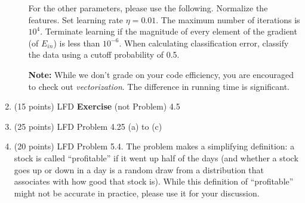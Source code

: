 \documentclass[11pt]{article}
\begin{document}
\begin{enumerate}
\begin{itemize}
    \vspace{5pt}
    For the other parameters, please use the following. 
    Normalize the features. 
    Set learning rate $\eta=0.01$. 
    The maximum number of iterations is $10^4$. 
    Terminate learning if the magnitude of every element of the gradient (of $E_{in}$) is less than $10^{-6}$.
    When calculating classification error, classify the data using a cutoff probability of 0.5.

    \vspace{5pt}
    \textbf{Note:} While we don't grade on your code efficiency, you are encouraged to check out \emph{vectorization}. The difference in running time is significant.

\end{itemize}
\item (15 points) LFD \textbf{Exercise} (not Problem) 4.5

\item (25 points) LFD Problem 4.25 (a) to (c) 

\item (20 points) LFD Problem 5.4. 
The problem makes a simplifying definition: a stock is called ``profitable'' if it went up half of the days (and whether a stock goes up or down in a day is a random draw from a distribution that associates with how good that stock is).
While this definition of ``profitable'' might not be accurate in practice, please use it for your discussion.

%
%
%
%

\footnotesize{

}
\end{enumerate}
\end{document}
